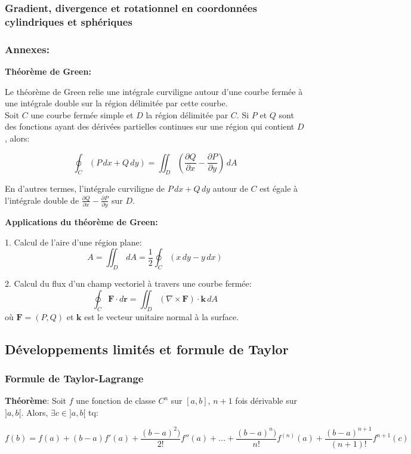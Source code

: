 \subsubsection{Gradient, divergence et rotationnel en coordonnées cylindriques et sphériques}


\subsubsection{Annexes:}
\textbf{Théorème de Green:}

Le théorème de Green relie une intégrale curviligne autour d'une courbe fermée à une intégrale double sur la région délimitée par cette courbe.
\\
Soit $C$ une courbe fermée simple et $D$ la région délimitée par $C$. Si $P$ et $Q$ sont des fonctions ayant des dérivées partielles continues sur une région qui contient $D$, alors:

$$
\oint_C (P \, dx + Q \, dy) = \iint_D \left( \frac{\partial Q}{\partial x} - \frac{\partial P}{\partial y} \right) \, dA
$$

En d'autres termes, l'intégrale curviligne de $P \, dx + Q \, dy$ autour de $C$ est égale à l'intégrale double de $\frac{\partial Q}{\partial x} - \frac{\partial P}{\partial y}$ sur $D$.

\textbf{Applications du théorème de Green:}

1. Calcul de l'aire d'une région plane:
$$
A = \iint_D \, dA = \frac{1}{2} \oint_C (x \, dy - y \, dx)
$$

2. Calcul du flux d'un champ vectoriel à travers une courbe fermée:
$$
\oint_C \mathbf{F} \cdot d\mathbf{r} = \iint_D (\nabla \times \mathbf{F}) \cdot \mathbf{k} \, dA
$$
où $\mathbf{F} = (P, Q)$ et $\mathbf{k}$ est le vecteur unitaire normal à la surface.

\subsection{Développements limités et formule de Taylor}

\subsubsection{Formule de Taylor-Lagrange}
\textbf{Théorème}: Soit $f$ une fonction de classe $C^n$ sur $[a, b]$, $n+1$ fois dérivable sur $]a, b[$.
Alors, $\exists c \in ]a, b[$ tq:

$$
    f(b) = f(a) + (b-a)f'(a) + \frac{(b-a)^2)}{2!}f''(a) + ... + \frac{(b-a)^n)}{n!}f^{(n)}(a) + \frac{(b-a)^{n+1}}{(n+1)!} f^{n+1}(c)
$$

